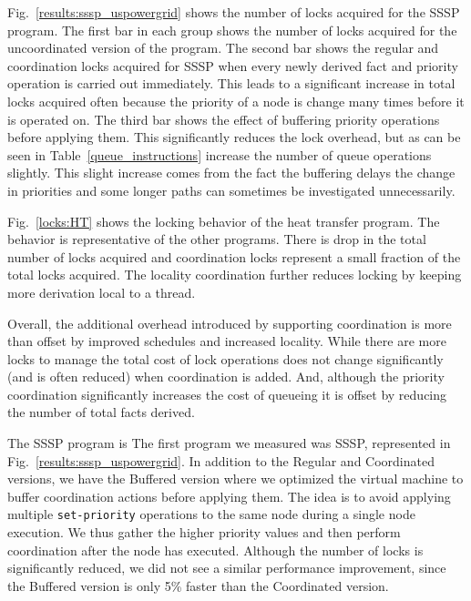 Fig.~\ref{results:sssp_uspowergrid} shows the number of locks acquired
for the SSSP program.  The first bar in each group shows the number of
locks acquired for the uncoordinated version of the program.  The
second bar shows the regular and coordination locks acquired for SSSP
when every newly derived fact and priority operation is carried out
immediately.  This leads to a significant increase in total locks
acquired often because the priority of a node is change many times
before it is operated on.  The third bar shows the effect of buffering
priority operations before applying them.  This significantly reduces
the lock overhead, but as can be seen in
Table~\ref{queue_instructions} increase the number of queue operations
slightly.  This slight increase comes from the fact the buffering
delays the change in priorities and some longer paths can sometimes be
investigated unnecessarily.

Fig.~\ref{locks:HT} shows the locking behavior of the heat transfer
program.  The behavior is representative of the other programs.  There
is drop in the total number of locks acquired and coordination locks
represent a small fraction of the total locks acquired.  The locality
coordination further reduces locking by keeping more derivation local
to a thread.

Overall, the additional overhead introduced by supporting coordination
is more than offset by improved schedules and increased locality.
While there are more locks to manage the total cost of lock operations
does not change significantly (and is often reduced) when coordination
is added.  And, although the priority coordination significantly
increases the cost of queueing it is offset by reducing the number of
total facts derived.


\iffalse

  The
SSSP program is The first program we measured was SSSP, represented in
Fig.~\ref{results:sssp_uspowergrid}. In addition to the Regular and
Coordinated versions, we have the Buffered version where we optimized
the virtual machine to buffer coordination actions before applying
them. The idea is to avoid applying multiple \texttt{set-priority}
operations to the same node during a single node execution. We thus
gather the higher priority values and then perform coordination after
the node has executed.  Although the number of locks is significantly
reduced, we did not see a similar performance improvement, since the
Buffered version is only 5\% faster than the Coordinated version.


